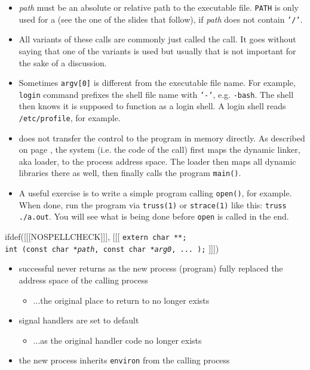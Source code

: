 \label{EXEC}

\begin{itemize}
\item \emph{path} must be an absolute or relative path to the executable file.
\texttt{PATH} is only used for  a  (see the one of
the slides that follow), if \emph{path} does not contain \texttt{'/'}.
\item All variants of these calls are commonly just called the 
call.  It goes without saying that one of the variants is used but usually that
is not important for the sake of a discussion.
\item Sometimes \texttt{argv[0]} is different from the executable file name.
For example, \texttt{login} command prefixes the shell file name with
\texttt{'-'}, e.g. \texttt{-bash}.  The shell then knows it is supposed to
function as a login shell.  A login shell reads \texttt{/etc/profile}, for
example.
\item {} does not transfer the control to the program in memory
directly. As described on page \pageref{RUNTIMELINKER}, the system (i.e. the
code of the  call) first maps the dynamic linker, aka loader, to the
process address space.  The loader then maps all dynamic libraries there as
well, then finally calls the program \texttt{main()}.
\item A useful exercise is to write a simple program calling \texttt{open()},
for example.  When done, run the program via \texttt{truss(1)} or
\texttt{strace(1)} like this: \texttt{truss ./a.out}. You will see what is being
done before \texttt{open} is called in the end.
\end{itemize}

\begin{slide}
ifdef([[[NOSPELLCHECK]]], [[[
\texttt{extern char **;\\
int (const char *\emph{path}, const char *\emph{arg0}, ... );}
]]])
\begin{itemize}
\item successful  never returns as the new process (program) fully
replaced the address space of the calling process
\begin{itemize}
\item ...the original place to return to no longer exists
\end{itemize}
\item signal handlers are set to default
\begin{itemize}
\item ...as the original handler code no longer exists
\end{itemize}
\item the new process inherits \texttt{environ} from the calling process
\end{itemize}
\end{slide}

